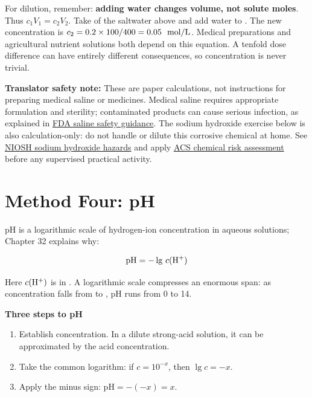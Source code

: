 For dilution, remember: \textbf{adding water changes volume, not solute moles}. Thus $c_1V_1 = c_2V_2$. Take  of the  saltwater above and add water to . The new concentration is $c_2 = 0.2\times100/400 = 0.05\ \ud{}{mol/L}$. Medical preparations and agricultural nutrient solutions both depend on this equation. A tenfold dose difference can have entirely different consequences, so concentration is never trivial.

\textbf{Translator safety note:} These are paper calculations, not instructions for preparing medical saline or medicines. Medical saline requires appropriate formulation and sterility; contaminated products can cause serious infection, as explained in \href{https://www.fda.gov/medical-devices/safety-communications/recall-certain-saline-and-sterile-water-medical-products-associated-nurse-assist-fda-safety}{FDA saline safety guidance}. The sodium hydroxide exercise below is also calculation-only: do not handle or dilute this corrosive chemical at home. See \href{https://www.cdc.gov/niosh/npg/npgd0565.html}{NIOSH sodium hydroxide hazards} and apply \href{https://institute.acs.org/acs-center/lab-safety/education-training/safer-experiments.html}{ACS chemical risk assessment} before any supervised practical activity.

\section{Method Four: pH}

pH is a logarithmic scale of hydrogen-ion concentration in aqueous solutions; Chapter 32 explains why:

\[
\mathrm{pH} = -\lg\,c(\mathrm{H^+})
\]

Here $c(\mathrm{H^+})$ is in . A logarithmic scale compresses an enormous span: as  concentration falls from  to , pH runs from 0 to 14.

\textbf{Three steps to pH}

\begin{enumerate}[itemsep=2pt]
\item Establish  concentration. In a dilute strong-acid solution, it can be approximated by the acid concentration.
\item Take the common logarithm: if $c = 10^{-x}$, then $\lg c = -x$.
\item Apply the minus sign: $\mathrm{pH} = -(-x) = x$.
\end{enumerate}

